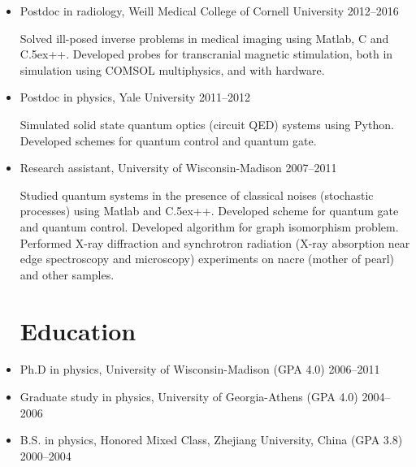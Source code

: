 \documentclass[centered,11pt,overlapped]{res}
\def\Cplusplus{{\rm C\raise.5ex\hbox{\small ++}}}
\begin{document}
\begin{resume}
{\begin{itemize}
Implement analysis toolkit for molecular dynamics trajectories using Python. 
Maintain scientific computing services using AWS, Go, Python, PostgreSQL, and Polymer.js.
Maintain atom mapping module (subgraph isomorphism) for free energy perturbation.

\item Postdoc in radiology, Weill Medical College of Cornell University \hfill 2012--2016 

Solved ill-posed inverse problems in medical imaging using Matlab, C and \Cplusplus.
Developed probes for transcranial magnetic stimulation, both in simulation using COMSOL multiphysics, and with hardware.

\item Postdoc in physics, Yale University \hfill 2011--2012

Simulated solid state quantum optics (circuit QED) systems using Python. 
Developed schemes for quantum control and quantum gate.
\item {Research assistant, University of Wisconsin-Madison} \hfill {2007--2011} 

Studied quantum systems in the presence of classical noises (stochastic processes) using Matlab and \Cplusplus.
Developed scheme for quantum gate and quantum control.
Developed algorithm for graph isomorphism problem.
Performed X-ray diffraction and synchrotron radiation (X-ray absorption near edge spectroscopy and microscopy) experiments on nacre (mother of pearl) and other samples.

\section{\sc Education}
\item {Ph.D in physics, University of Wisconsin-Madison (GPA 4.0)} \hfill {2006--2011} 
\item {Graduate study in physics, University of Georgia-Athens (GPA 4.0)} \hfill {2004--2006}  
\item {B.S. in physics, Honored Mixed Class},  
{Zhejiang University, China (GPA 3.8)} \hfill {2000--2004}  
\end{itemize}



}
\end{resume}
\end{document}
